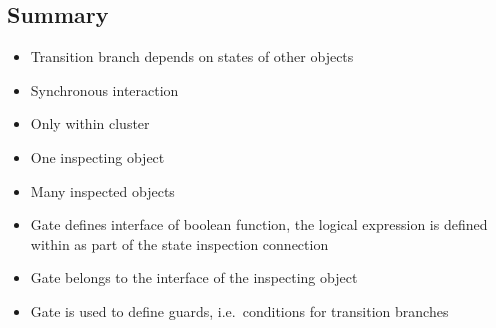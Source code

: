 \clearpage
\hypertarget{summary}{%
\subsection{Summary}\label{summary}}

\begin{itemize}
\tightlist
\item
  Transition branch depends on states of other objects
\item
  Synchronous interaction
\item
  Only within cluster
\item
  One inspecting object
\item
  Many inspected objects
\item
  Gate defines interface of boolean function, the logical expression is
  defined within as part of the state inspection connection
\item
  Gate belongs to the interface of the inspecting object
\item
  Gate is used to define guards, i.e.~conditions for transition branches
\end{itemize}

\clearpage